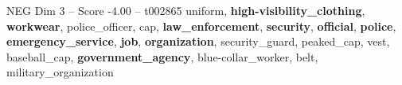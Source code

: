 \begin{textsample}{NEG Dim 3 – Score -4.00 – t002865}  \label{ex:f3_neg_035}
uniform, \textbf{high-visibility\_clothing}, \textbf{workwear}, police\_officer, cap, \textbf{law\_enforcement}, \textbf{security}, \textbf{official}, \textbf{police}, \textbf{emergency\_service}, \textbf{job}, \textbf{organization}, security\_guard, peaked\_cap, vest, baseball\_cap, \textbf{government\_agency}, blue-collar\_worker, belt, military\_organization

\end{textsample}
